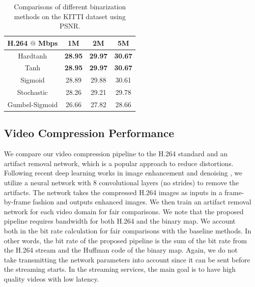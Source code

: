\documentclass[letterpaper]{article} %
\begin{document}
\begin{table}[t]
\caption{Comparisons of different binarization methods on the KITTI dataset using PSNR.
}
\centering
\begin{tabular}{cccc}
\toprule
H.264 $@$ Mbps & 1M & 2M & 5M \\
\hline

Hardtanh & \textbf{28.95} & \textbf{29.97} & \textbf{30.67} \\
\hline

Tanh & \textbf{28.95} & \textbf{29.97} & \textbf{30.67} \\
\hline

Sigmoid & 28.89 & 29.88 & 30.61 \\
\hline

Stochastic & 28.26 & 29.21 & 29.78 \\
\hline

Gumbel-Sigmoid & 26.66 & 27.82 & 28.66 \\
\bottomrule
\end{tabular}
\label{tab:binary_psnr}
\end{table}

\subsection{Video Compression Performance}

We compare our video compression pipeline to the H.264 standard and an artifact removal network, which is a popular approach to reduce distortions. Following recent deep learning works in image enhancement and denoising \cite{Kim_CVPR_2016,Zhang_TIP_2017}, we utilize a neural network with 8 convolutional layers (no strides) to remove the artifacts. The network takes the compressed H.264 images as inputs in a frame-by-frame fashion and outputs enhanced images. We then train an artifact removal network for each video domain for fair comparisons.  We note that the proposed pipeline requires bandwidth for both H.264 and the binary map. We account both in the bit rate calculation for fair comparisons with the baseline methods. In other words, the bit rate of the proposed pipeline is the sum of the bit rate from the H.264 stream and the Huffman code of the binary map. Again, we do not take transmitting the network parameters into account since it can be sent before the streaming starts. In the streaming services, the main goal is to have high quality videos with low latency.
\end{document}
